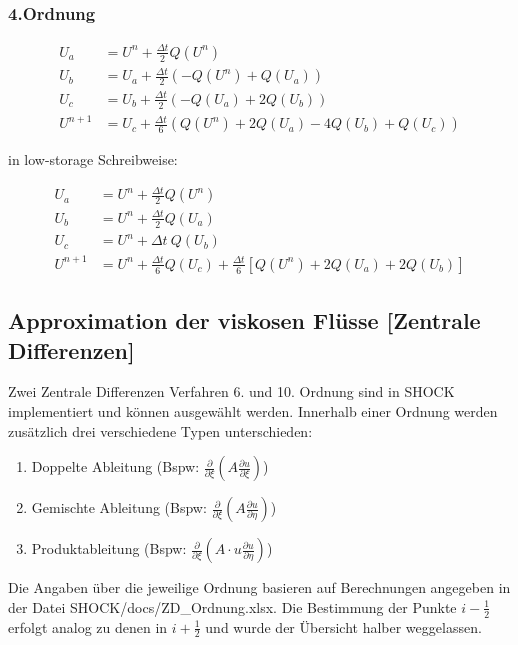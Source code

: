 \subsubsection{4.Ordnung}
\begin{align*}
U_{a}&=U^{n}+ \frac{\varDelta t}{2} Q\left(U^{n}\right)
\\
U_{b}&=U_{a}+ \frac{\varDelta t}{2} \left(-Q\left(U^{n}\right)+Q\left(U_{a}\right)\right)
\\
U_{c}&=U_{b}+ \frac{\varDelta t}{2} \left(-Q\left(U_{a}\right)+2Q\left(U_{b}\right)\right)
\\
U^{n+1}&=U_{c}+\frac{\varDelta t}{6} \left(Q\left(U^{n}\right)+2Q\left(U_{a}\right)-4Q\left(U_{b}\right)+Q\left(U_{c}\right)\right)
\end{align*}

in low-storage Schreibweise:

\begin{align*}
U_{a}&=U^{n}+ \frac{\varDelta t}{2} Q\left(U^{n}\right)
\\
U_{b}&=U^{n}+ \frac{\varDelta t}{2} Q\left(U_{a}\right)
\\
U_{c}&=U^{n}+ \varDelta t\ Q\left(U_{b}\right)
\\
U^{n+1}&=U^{n}+\frac{\varDelta t}{6}Q\left(U_{c}\right)+\frac{\varDelta t}{6} \left[Q\left(U^{n}\right)+2 Q\left(U_{a}\right)+2 Q\left(U_{b}\right)\right]
\end{align*}

\newpage

\subsection{Approximation der viskosen Flüsse [Zentrale Differenzen]}
Zwei Zentrale Differenzen Verfahren 6. und 10. Ordnung sind in SHOCK implementiert und können ausgewählt werden.
Innerhalb einer Ordnung werden zusätzlich drei verschiedene Typen unterschieden:
\begin{enumerate}
\item Doppelte Ableitung (Bspw: $\frac{\partial}{\partial \xi} \left(A\frac{\partial u}{ \partial \xi}\right)$)
\item Gemischte Ableitung (Bspw: $\frac{\partial}{\partial \xi} \left(A\frac{\partial u}{ \partial \eta}\right)$)
\item Produktableitung (Bspw: $\frac{\partial}{\partial \xi} \left(A \cdot u\frac{\partial u}{ \partial \eta}\right)$)
\end{enumerate}
Die Angaben über die jeweilige Ordnung basieren auf Berechnungen angegeben in der Datei SHOCK/docs/ZD\_Ordnung.xlsx.
Die Bestimmung der Punkte $i-\frac{1}{2}$ erfolgt analog zu denen in $i+\frac{1}{2}$ und wurde der Übersicht halber weggelassen.

